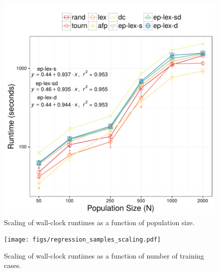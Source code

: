 \documentclass[twoside]{article}
\begin{document}
\begin{figure}
\begin{minipage}{0.49\textwidth}
\centering
  \includegraphics[width=\textwidth]{figs/regression_popsize_scaling.pdf}\\
 \caption{Scaling of wall-clock runtimes as a function of population size.}\label{fig:time_pop}
 \end{minipage}
 \hspace{0.02\textwidth}
 \begin{minipage}{0.49\textwidth}
 \centering
  \texttt{[image: figs/regression\_samples\_scaling.pdf]}\\
 \caption{Scaling of wall-clock runtimes as a function of number of training cases.}\label{fig:time_samples}

 \end{minipage}

\end{figure}
\end{document}
